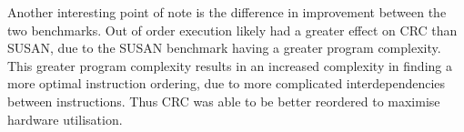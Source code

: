 Another interesting point of note is the difference in improvement between the
two benchmarks. Out of order execution likely had a greater effect on CRC than
SUSAN, due to the SUSAN benchmark having a greater program complexity. This
greater program complexity results in an increased complexity in finding a more
optimal instruction ordering, due to more complicated interdependencies between
instructions. Thus CRC was able to be better reordered to maximise hardware
utilisation.

